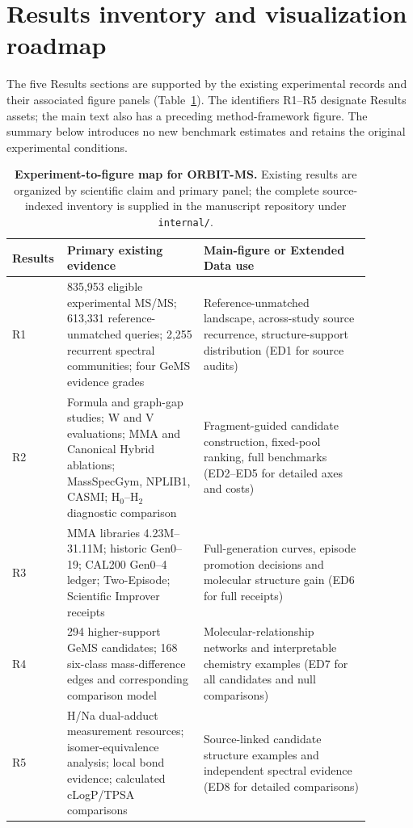 \clearpage
\section{Results inventory and visualization roadmap}
\label{sec:results_visualization_roadmap}

The five Results sections are supported by the existing experimental records
and their associated figure panels (Table~\ref{tab:results_figure_map}).
The identifiers R1--R5 designate Results assets; the main text also has
a preceding method-framework figure. The summary below introduces no new
benchmark estimates and retains the original experimental conditions.

\begin{table}[!htbp]
\centering
\caption{\textbf{Experiment-to-figure map for ORBIT-MS.}
Existing results are organized by scientific claim and primary panel;
the complete source-indexed inventory is supplied in the manuscript
repository under \texttt{internal/}.}
\label{tab:results_figure_map}
\small
\setlength{\tabcolsep}{4pt}
\renewcommand{\arraystretch}{1.12}
\begin{tabular}{@{}p{0.08\linewidth}p{0.36\linewidth}p{0.44\linewidth}@{}}
\toprule
Results & Primary existing evidence & Main-figure or Extended Data use \\
\midrule
R1 & 835,953 eligible experimental MS/MS; 613,331 reference-unmatched queries; 2,255 recurrent spectral communities; four GeMS evidence grades & Reference-unmatched landscape, across-study source recurrence, structure-support distribution (ED1 for source audits) \\
R2 & Formula and graph-gap studies; W and V evaluations; MMA and Canonical Hybrid ablations; MassSpecGym, NPLIB1, CASMI; H$_0$--H$_2$ diagnostic comparison & Fragment-guided candidate construction, fixed-pool ranking, full benchmarks (ED2--ED5 for detailed axes and costs) \\
R3 & MMA libraries 4.23M--31.11M; historic Gen0--19; CAL200 Gen0--4 ledger; Two-Episode; Scientific Improver receipts & Full-generation curves, episode promotion decisions and molecular structure gain (ED6 for full receipts) \\
R4 & 294 higher-support GeMS candidates; 168 six-class mass-difference edges and corresponding comparison model & Molecular-relationship networks and interpretable chemistry examples (ED7 for all candidates and null comparisons) \\
R5 & H/Na dual-adduct measurement resources; isomer-equivalence analysis; local bond evidence; calculated cLogP/TPSA comparisons & Source-linked candidate structure examples and independent spectral evidence (ED8 for detailed comparisons) \\
\bottomrule
\end{tabular}
\end{table}

